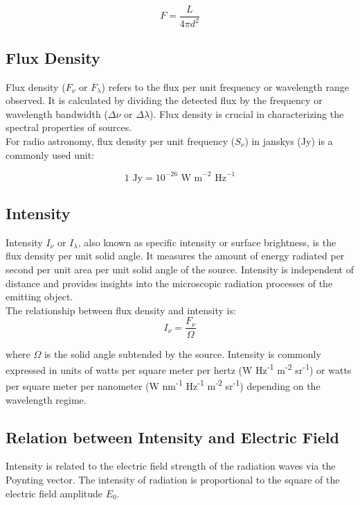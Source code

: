 \[ F = \frac{L}{4 \pi d^2} \]

\subsection{Flux Density}

Flux density ($F_{\nu}$ or $F_{\lambda}$) refers to the flux per unit frequency or wavelength range observed. It is calculated by dividing the detected flux by the frequency or wavelength bandwidth (\( \Delta \nu \) or \( \Delta \lambda \)). Flux density is crucial in characterizing the spectral properties of sources. \\

For radio astronomy, flux density per unit frequency (\( S_{\nu} \)) in janskys (Jy) is a commonly used unit:

\[ 1 \text{ Jy} = 10^{-26} \text{ W m}^{-2} \text{ Hz}^{-1} \]

\subsection{Intensity}

Intensity $I_{\nu}$ or $I_{\lambda}$, also known as specific intensity or surface brightness, is the flux density per unit solid angle. It measures the amount of energy radiated per second per unit area per unit solid angle of the source. Intensity is independent of distance and provides insights into the microscopic radiation processes of the emitting object. \\

The relationship between flux density and intensity is:
\[ I_\nu = \frac{F_\nu}{\Omega} \]

where \( \Omega \) is the solid angle subtended by the source. Intensity is commonly expressed in units of watts per square meter per hertz (W Hz\textsuperscript{-1} m\textsuperscript{-2} sr\textsuperscript{-1}) or watts per square meter per nanometer (W nm\textsuperscript{-1} Hz\textsuperscript{-1} m\textsuperscript{-2} sr\textsuperscript{-1}) depending on the wavelength regime.

\subsection{Relation between Intensity and Electric Field}

Intensity is related to the electric field strength of the radiation waves via the Poynting vector. The intensity of radiation is proportional to the square of the electric field amplitude \( E_0 \).

